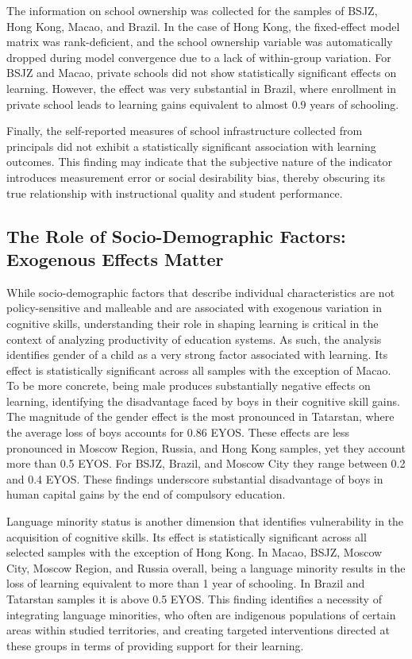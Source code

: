 \documentclass[
]{article}
\begin{document}
The information on school ownership was collected for the samples of
BSJZ, Hong Kong, Macao, and Brazil. In the case of Hong Kong, the
fixed-effect model matrix was rank-deficient, and the school ownership
variable was automatically dropped during model convergence due to a
lack of within-group variation. For BSJZ and Macao, private schools did
not show statistically significant effects on learning. However, the
effect was very substantial in Brazil, where enrollment in private
school leads to learning gains equivalent to almost 0.9 years of
schooling.

Finally, the self-reported measures of school infrastructure collected
from principals did not exhibit a statistically significant association
with learning outcomes. This finding may indicate that the subjective
nature of the indicator introduces measurement error or social
desirability bias, thereby obscuring its true relationship with
instructional quality and student performance.

\subsection{The Role of Socio-Demographic Factors: Exogenous Effects
Matter}\label{the-role-of-socio-demographic-factors-exogenous-effects-matter}

While socio-demographic factors that describe individual characteristics
are not policy-sensitive and malleable and are associated with exogenous
variation in cognitive skills, understanding their role in shaping
learning is critical in the context of analyzing productivity of
education systems. As such, the analysis identifies gender of a child as
a very strong factor associated with learning. Its effect is
statistically significant across all samples with the exception of
Macao. To be more concrete, being male produces substantially negative
effects on learning, identifying the disadvantage faced by boys in their
cognitive skill gains. The magnitude of the gender effect is the most
pronounced in Tatarstan, where the average loss of boys accounts for
0.86 EYOS. These effects are less pronounced in Moscow Region, Russia,
and Hong Kong samples, yet they account more than 0.5 EYOS. For BSJZ,
Brazil, and Moscow City they range between 0.2 and 0.4 EYOS. These
findings underscore substantial disadvantage of boys in human capital
gains by the end of compulsory education.

Language minority status is another dimension that identifies
vulnerability in the acquisition of cognitive skills. Its effect is
statistically significant across all selected samples with the exception
of Hong Kong. In Macao, BSJZ, Moscow City, Moscow Region, and Russia
overall, being a language minority results in the loss of learning
equivalent to more than 1 year of schooling. In Brazil and Tatarstan
samples it is above 0.5 EYOS. This finding identifies a necessity of
integrating language minorities, who often are indigenous populations of
certain areas within studied territories, and creating targeted
interventions directed at these groups in terms of providing support for
their learning.
\end{document}
